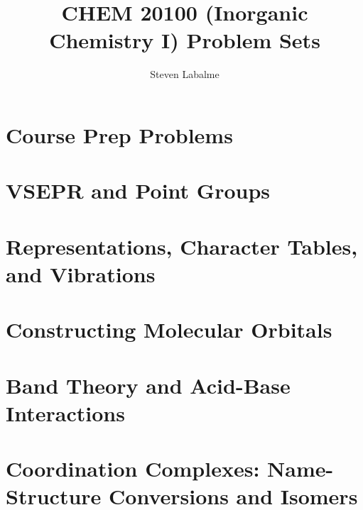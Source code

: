 \documentclass[titlepage]{article}
\title{CHEM 20100 (Inorganic Chemistry I) Problem Sets}
\author{Steven Labalme}
\begin{document}
\maketitle



\tableofcontents
\newpage



\pagestyle{main}
\renewcommand{\leftmark}{Problem Set \thesection}
\setcounter{section}{-1}
\section{Course Prep Problems}

\newpage



\section{VSEPR and Point Groups}

\newpage



\section{Representations, Character Tables, and Vibrations}

\newpage



\section{Constructing Molecular Orbitals}

\newpage



\section{Band Theory and Acid-Base Interactions}

\newpage



\section{Coordination Complexes: Name-Structure Conversions and Isomers}

\end{document}
